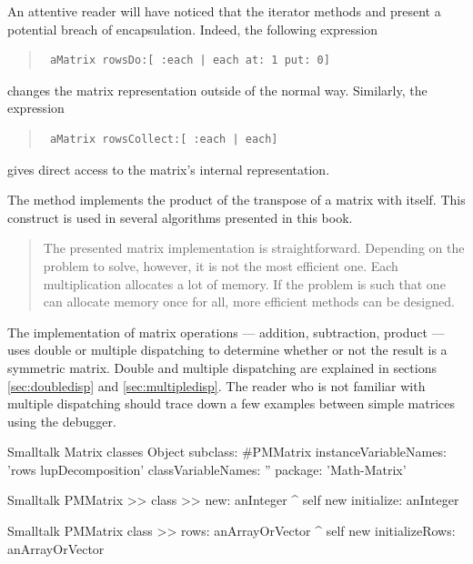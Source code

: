 An attentive reader will have noticed that the iterator methods
 and  present a potential breach of
encapsulation. Indeed, the following expression
\begin{quote}
\begin{verbatim}
 aMatrix rowsDo:[ :each | each at: 1 put: 0]
\end{verbatim}
\end{quote}
changes the matrix representation outside of the normal way.
Similarly, the expression
\begin{quote}
\begin{verbatim}
 aMatrix rowsCollect:[ :each | each]
\end{verbatim}
\end{quote}
gives direct access to the matrix's internal representation.

The method  implements the product of the transpose of
a matrix with itself. This construct is used in several algorithms
presented in this book.

\begin{quotation}
 The presented matrix implementation is
straightforward. Depending on the problem to solve, however, it is
not the most efficient one. Each multiplication allocates a lot of
memory. If the problem is such that one can allocate memory once
for all, more efficient methods can be designed.
\end{quotation}

The implementation of matrix operations --- addition, subtraction,
product --- uses double or multiple dispatching to determine
whether or not the result is a symmetric matrix. Double and
multiple dispatching are explained in sections
\ref{sec:doubledisp} and \ref{sec:multipledisp}. The reader who is
not familiar with multiple dispatching should trace down a few
examples between simple matrices using the debugger.

\begin{listing}[label=lst:matrix]{Smalltalk}
{Matrix classes}
Object subclass: #PMMatrix
   instanceVariableNames: 'rows lupDecomposition'
   classVariableNames: ''
   package: 'Math-Matrix'
\end{listing}

\begin{displaycode}{Smalltalk}
PMMatrix >> class >> new: anInteger
    ^ self new initialize: anInteger
\end{displaycode}

\begin{displaycode}{Smalltalk}
PMMatrix class >> rows: anArrayOrVector
    ^ self new initializeRows: anArrayOrVector
\end{displaycode}

